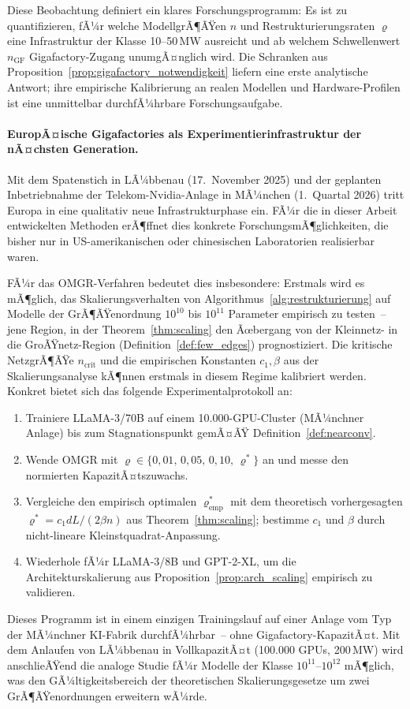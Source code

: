 ﻿\documentclass[12pt, a4paper, openany]{report}
\begin{document}
Diese Beobachtung definiert ein klares Forschungsprogramm: Es ist zu
quantifizieren, fÃ¼r welche ModellgrÃ¶ÃŸen $n$ und Restrukturierungsraten
$\varrho$ eine Infrastruktur der Klasse 10--50\,MW ausreicht und ab
welchem Schwellenwert $n_{\mathrm{GF}}$ Gigafactory-Zugang unumgÃ¤nglich
wird.  Die Schranken aus Proposition~\ref{prop:gigafactory_notwendigkeit}
liefern eine erste analytische Antwort; ihre empirische Kalibrierung an
realen Modellen und Hardware-Profilen ist eine unmittelbar
durchfÃ¼hrbare Forschungsaufgabe.

\paragraph{EuropÃ¤ische Gigafactories als Experimentierinfrastruktur
  der nÃ¤chsten Generation.}
Mit dem Spatenstich in LÃ¼bbenau (17.~November 2025) und der geplanten
Inbetriebnahme der Telekom-Nvidia-Anlage in MÃ¼nchen (1.~Quartal 2026)
tritt Europa in eine qualitativ neue Infrastrukturphase ein.  FÃ¼r die
in dieser Arbeit entwickelten Methoden erÃ¶ffnet dies konkrete
ForschungsmÃ¶glichkeiten, die bisher nur in US-amerikanischen oder
chinesischen Laboratorien realisierbar waren.

FÃ¼r das OMGR-Verfahren bedeutet dies insbesondere: Erstmals wird es
mÃ¶glich, das Skalierungsverhalten von
Algorithmus~\ref{alg:restrukturierung} auf Modelle der GrÃ¶ÃŸenordnung
$10^{10}$ bis $10^{11}$ Parameter empirisch zu testen~-- jene Region,
in der Theorem~\ref{thm:scaling} den Ãœbergang von der Kleinnetz- in die
GroÃŸnetz-Region (Definition~\ref{def:few_edges}) prognostiziert.  Die
kritische NetzgrÃ¶ÃŸe $n_{\mathrm{crit}}$ und die empirischen Konstanten
$c_1, \beta$ aus der Skalierungsanalyse kÃ¶nnen erstmals in diesem Regime
kalibriert werden.  Konkret bietet sich das folgende
Experimentalprotokoll an:
\begin{enumerate}[label=(\roman*)]
  \item Trainiere LLaMA-3/70B auf einem 10.000-GPU-Cluster (MÃ¼nchner
    Anlage) bis zum Stagnationspunkt gemÃ¤ÃŸ
    Definition~\ref{def:nearconv}.
  \item Wende OMGR mit
    $\varrho \in \{0{,}01,\, 0{,}05,\, 0{,}10,\, \varrho^*\}$ an und
    messe den normierten KapazitÃ¤tszuwachs.
  \item Vergleiche den empirisch optimalen $\varrho_{\mathrm{emp}}^*$ mit
    dem theoretisch vorhergesagten
    $\varrho^* = c_1 dL / (2\beta n)$ aus Theorem~\ref{thm:scaling};
    bestimme $c_1$ und $\beta$ durch nicht-lineare
    Kleinstquadrat-Anpassung.
  \item Wiederhole fÃ¼r LLaMA-3/8B und GPT-2-XL, um die
    Architekturskalierung aus Proposition~\ref{prop:arch_scaling}
    empirisch zu validieren.
\end{enumerate}
Dieses Programm ist in einem einzigen Trainingslauf auf einer Anlage
vom Typ der MÃ¼nchner KI-Fabrik durchfÃ¼hrbar~-- ohne Gigafactory-KapazitÃ¤t.
Mit dem Anlaufen von LÃ¼bbenau in VollkapazitÃ¤t (100.000 GPUs, 200\,MW)
wird anschlieÃŸend die analoge Studie fÃ¼r Modelle der
Klasse $10^{11}$--$10^{12}$ mÃ¶glich, was den GÃ¼ltigkeitsbereich der
theoretischen Skalierungsgesetze um zwei GrÃ¶ÃŸenordnungen erweitern wÃ¼rde.
\end{document}
